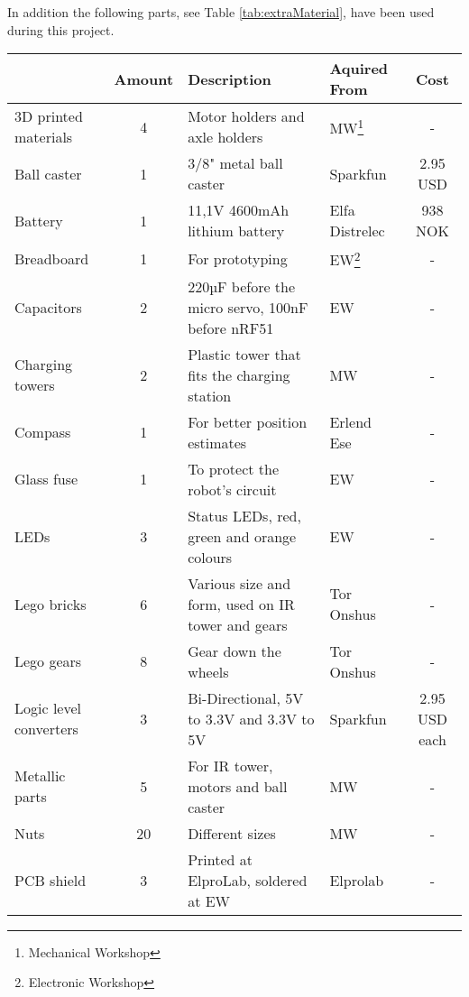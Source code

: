 In addition the following parts, see Table \ref{tab:extraMaterial}, have been used during this project.

\begin{sidewaystable}[ht]
\centering
\caption{Extra Material}
\label{tab:extraMaterial}
\begin{tabular}{|l|c|l|l|c|}
\hline
\rowcolor[HTML]{C0C0C0} 
\multicolumn{1}{|l|}{\cellcolor[HTML]{C0C0C0}\textbf{Part}} & \multicolumn{1}{l|}{\cellcolor[HTML]{C0C0C0}\textbf{Amount}} & \multicolumn{1}{l|}{\cellcolor[HTML]{C0C0C0}\textbf{Description}} & \multicolumn{1}{l|}{\cellcolor[HTML]{C0C0C0}\textbf{Aquired From}} & \multicolumn{1}{c|}{\cellcolor[HTML]{C0C0C0}\textbf{Cost}} \\ \hline
3D printed materials & 4 & Motor  holders and axle holders & MW\footnote{Mechanical Workshop} & - \\
Ball caster & 1 & 3/8" metal ball caster & Sparkfun & 2.95 USD \\
Battery & 1 & 11,1V 4600mAh lithium battery & Elfa Distrelec & 938 NOK \\
Breadboard & 1 & For prototyping & EW\footnote{Electronic Workshop} & - \\
Capacitors & 2 & 220µF before the micro servo, 100nF before nRF51 & EW & - \\
Charging towers & 2 & Plastic tower that fits the charging station & MW & - \\
Compass & 1 & For better position estimates & Erlend Ese & - \\
Glass fuse & 1 & To protect the robot's circuit & EW & - \\
LEDs & 3 & Status LEDs, red, green and orange colours & EW & - \\
Lego bricks & 6 & Various size and form, used on IR tower and gears & Tor Onshus & - \\
Lego gears & 8 & Gear down the wheels & Tor Onshus & - \\
Logic level converters & 3 & Bi-Directional, 5V to 3.3V and 3.3V to 5V & Sparkfun & 2.95 USD each \\
Metallic parts & 5 & For IR tower, motors and ball caster & MW & - \\
Nuts & 20 & Different sizes & MW & - \\
PCB shield & 3 & Printed at ElproLab, soldered at EW & Elprolab & - \\

\end{tabular}
\end{sidewaystable}
